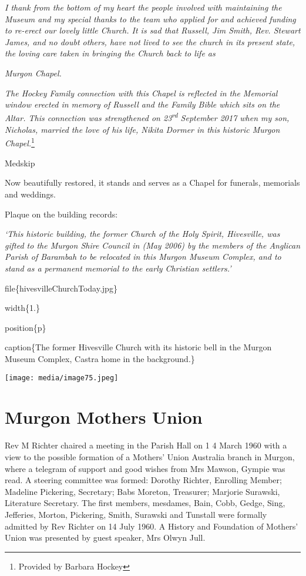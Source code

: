 \emph{I thank from the bottom of my heart the people involved with maintaining the Museum and my special thanks to the team who applied for and achieved funding to re-erect our lovely little Church. It is sad that Russell, Jim Smith, Rev. Stewart James, and no doubt others, have not lived to see the church in its present state, the loving care taken in bringing the Church back to life as}

\emph{Murgon Chapel.}

\emph{The Hockey Family connection with this Chapel is reflected in the Memorial window erected in memory of Russell and the Family Bible which sits on the Altar. This connection was strengthened on 23\textsuperscript{rd} September 2017 when my son, Nicholas, married the love of his life, Nikita Dormer in this historic Murgon Chapel.}\footnote{Provided by Barbara Hockey}

Medskip

Now beautifully restored, it stands and serves as a Chapel for funerals, memorials and weddings.

Plaque on the building records:

\emph{`This historic building, the former Church of the Holy Spirit, Hivesville, was gifted to the Murgon Shire Council in (May 2006) by the members of the Anglican Parish of Barambah to be relocated in this Murgon Museum Complex, and to stand as a permanent memorial to the early Christian settlers.'}

file\{hivesvilleChurchToday.jpg\}

width\{1.\}

position\{p\}

caption\{The former Hivesville Church with its historic bell in the Murgon Museum Complex, Castra home in the background.\}

\texttt{[image: media/image75.jpeg]}

\hypertarget{murgon-mothers-union}{%
\section{Murgon Mothers Union}\label{murgon-mothers-union}}

Rev M Richter chaired a meeting in the Parish Hall on 1 4 March 1960 with a view to the possible formation of a Mothers' Union Australia branch in Murgon, where a telegram of support and good wishes from Mrs Mawson, Gympie was read. A steering committee was formed: Dorothy Richter, Enrolling Member; Madeline Pickering, Secretary; Babs Moreton, Treasurer; Marjorie Surawski, Literature Secretary. The first members, mesdames, Bain, Cobb, Gedge, Sing, Jefferies, Morton, Pickering, Smith, Surawski and Tunstall were formally admitted by Rev Richter on 14 July 1960. A History and Foundation of Mothers' Union was presented by guest speaker, Mrs Olwyn Jull.

